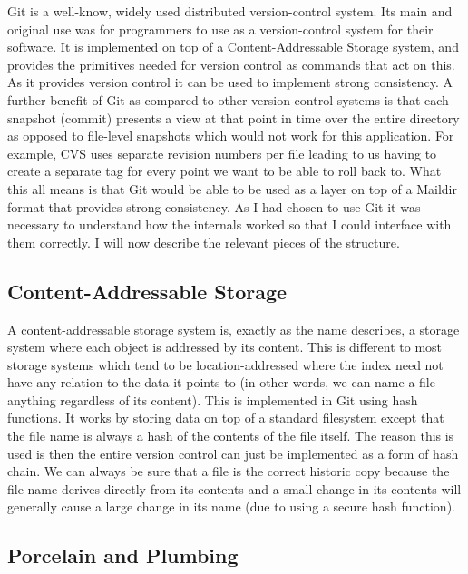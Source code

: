 Git\cite{code_git} is a well-know, widely used distributed version-control system. Its main and original use was for programmers to use as a version-control system for their software\cite{chacon2014git}. It is implemented on top of a Content-Addressable Storage system, and provides the primitives needed for version control as commands that act on this. As it provides version control it can be used to implement strong consistency. A further benefit of Git as compared to other version-control systems is that each snapshot (commit) presents a view at that point in time over the entire directory as opposed to file-level snapshots which would not work for this application. For example, CVS\cite{code_cvs} uses separate revision numbers per file leading to us having to create a separate tag for every point we want to be able to roll back to. What this all means is that Git would be able to be used as a layer on top of a Maildir format that provides strong consistency. As I had chosen to use Git it was necessary to understand how the internals worked so that I could interface with them correctly. I will now describe the relevant pieces of the structure.

\subsection{Content-Addressable Storage}

A content-addressable storage system is, exactly as the name describes, a storage system where each object is addressed by its content. This is different to most storage systems which tend to be location-addressed where the index need not have any relation to the data it points to (in other words, we can name a file anything regardless of its content). This is implemented in Git using hash functions. It works by storing data on top of a standard filesystem except that the file name is always a hash of the contents of the file itself. The reason this is used is then the entire version control can just be implemented as a form of hash chain. We can always be sure that a file is the correct historic copy because the file name derives directly from its contents and a small change in its contents will generally cause a large change in its name (due to using a secure hash function).

\subsection{Porcelain and Plumbing}

